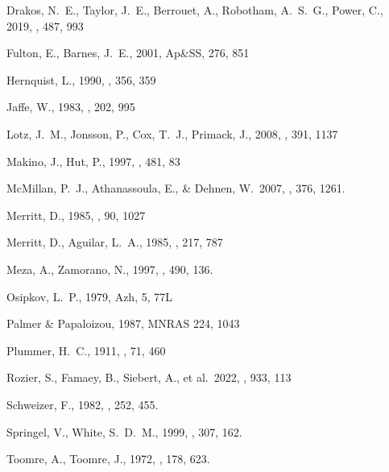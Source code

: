 \documentclass[fleqn,usenatbib]{mnras}
\begin{document}
\begin{thebibliography}{}
     Drakos, N.~E., Taylor, J.~E., Berrouet, A., Robotham, A.~S.~G., Power, C., 2019, \mnras, 487, 993

     Fulton, E., Barnes, J.~E., 2001, Ap\&SS, 276, 851
    
     Hernquist, L., 1990, \apj, 356, 359 %

     Jaffe, W., 1983, \mnras, 202, 995
    
     Lotz, J.~M., Jonsson, P., Cox, T.~J., Primack, J., 2008, \mnras, 391, 1137 %
    
     Makino, J., Hut, P., 1997, \apj, 481, 83 %

     McMillan, P.~J., Athanassoula, E., \& Dehnen, W.\ 2007, \mnras, 376, 1261. %
    
     Merritt, D., 1985, \aj, 90, 1027 %

     Merritt, D., Aguilar, L.~A., 1985, \mnras, 217, 787
    
     Meza, A., Zamorano, N., 1997, \apj, 490, 136. %
    
     Osipkov, L.~P., 1979, Azh, 5, 77L

     Palmer \& Papaloizou, 1987, MNRAS 224, 1043

     Plummer, H.~C., 1911, \mnras, 71, 460
 
     Rozier, S., Famaey, B., Siebert, A., et al.\ 2022, \apj, 933, 113 %
    
     Schweizer, F., 1982, \apj, 252, 455. %
    
     Springel, V., White, S.~D.~M., 1999, \mnras, 307, 162. %
    
     Toomre, A., Toomre, J., 1972, \apj, 178, 623. %
    

\end{thebibliography}
\end{document}
